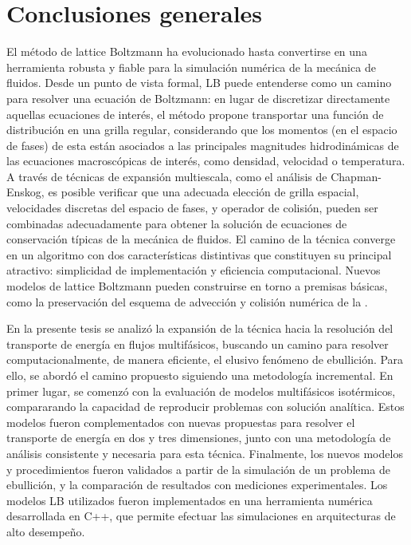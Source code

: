 \chapter{Conclusiones generales}

El m\'etodo de lattice Boltzmann ha evolucionado hasta convertirse en una herramienta robusta y fiable para la simulaci\'on num\'erica de la mec\'anica de fluidos. Desde un punto de vista formal, LB puede entenderse como un camino para resolver una ecuaci\'on de Boltzmann: en lugar de discretizar directamente aquellas ecuaciones de inter\'es, el m\'etodo propone transportar una funci\'on de distribuci\'on en una grilla regular, considerando que los momentos (en el espacio de fases) de esta \fdp{} est\'an asociados a las principales magnitudes hidrodin\'amicas de las ecuaciones macrosc\'opicas de inter\'es, como densidad, velocidad o temperatura. A trav\'es de t\'ecnicas de expansi\'on multiescala, como el an\'alisis de Chapman-Enskog, es posible verificar que una adecuada elecci\'on de grilla espacial, velocidades discretas del espacio de fases, y operador de colisi\'on, pueden ser combinadas adecuadamente para obtener la soluci\'on de ecuaciones de conservaci\'on t\'ipicas de la mec\'anica de fluidos. El camino de la t\'ecnica converge en un algoritmo con dos caracter\'isticas distintivas que constituyen su principal atractivo: simplicidad de implementaci\'on y eficiencia computacional. Nuevos modelos de lattice Boltzmann pueden construirse en torno a premisas b\'asicas, como la preservaci\'on del esquema de advecci\'on y colisi\'on num\'erica de la \fdp{}. 

En la presente tesis se analiz\'o la expansi\'on de la t\'ecnica hacia la resoluci\'on del transporte de energ\'ia en flujos multif\'asicos, buscando un camino para resolver computacionalmente, de manera eficiente, el elusivo fen\'omeno de ebullici\'on. Para ello, se abord\'o el camino propuesto siguiendo una metodolog\'ia incremental. En primer lugar, se comenz\'o con la evaluaci\'on de modelos multif\'asicos isot\'ermicos, compararando la capacidad de reproducir problemas con soluci\'on anal\'itica. Estos modelos fueron complementados con nuevas propuestas para resolver el transporte de energ\'ia en dos y tres dimensiones, junto con una metodolog\'ia de an\'alisis consistente y necesaria para esta t\'ecnica. Finalmente, los nuevos modelos y procedimientos fueron validados a partir de la simulaci\'on de un problema de ebullici\'on, y la comparaci\'on de resultados con mediciones experimentales. Los modelos LB utilizados fueron implementados en una herramienta num\'erica desarrollada en C++, que permite efectuar las simulaciones en arquitecturas de alto desempe\~no.

